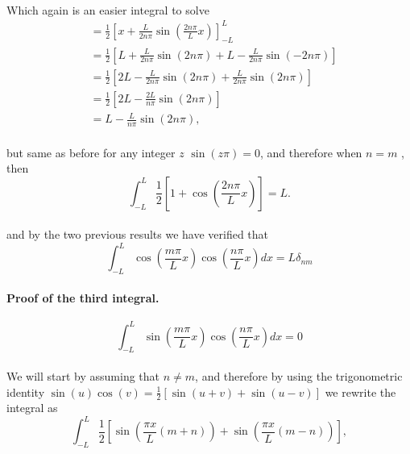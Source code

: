 \documentclass{article}
\begin{document}
\paragraph{} Which again is an easier integral to solve
\begin{align*}
&= \frac{1}{2} \left[ x + \frac{L}{2n\pi} \sin \left(\frac{2n\pi}{L} x\right) \right]_{-L}^{L}\\
&= \frac{1}{2} \left[ L + \frac{L}{2n\pi} \sin (2n\pi) + L - \frac{L}{2n\pi} \sin (-2n\pi) \right]\\
&= \frac{1}{2} \left[ 2L - \frac{L}{2n\pi} \sin (2n\pi) + \frac{L}{2n\pi} \sin (2n\pi) \right]\\
&= \frac{1}{2} \left[ 2L - \frac{2L}{n\pi} \sin (2n\pi) \right]\\
&= L - \frac{L}{n\pi} \sin (2n\pi),
\end{align*}
\paragraph{} but same as before for any integer $z$ $\sin (z\pi) = 0$, and therefore when $n = m$ , then
$$\int_{-L}^{L} \frac{1}{2} \left[ 1 + \cos \left(\frac{2n\pi}{L} x \right) \right] = L.$$
\paragraph{} and by the two previous results we have verified that
$$\int_{-L}^{L} \cos \left(\frac{m\pi}{L} x\right) \cos \left(\frac{n\pi}{L} x\right) dx = L\delta_{nm}$$
\paragraph{Proof of the third integral.}
$$\int_{-L}^{L} \sin \left(\frac{m\pi}{L} x\right) \cos \left(\frac{n\pi}{L} x\right) dx = 0$$
\paragraph{}We will start by assuming that $n \neq m$, and therefore by using the trigonometric identity $\sin (u) \cos (v) = \frac{1}{2} \left[\sin(u + v) + \sin (u - v) \right]$ we rewrite the integral as
$$\int_{-L}^{L} \frac{1}{2} \left[ \sin\left(\frac{\pi x}{L} (m + n)\right) + \sin\left(\frac{\pi x}{L} (m - n)\right) \right],$$
\end{document}
